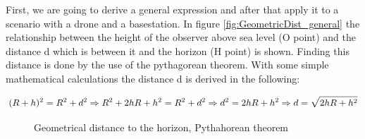 First, we are going to derive a general expression and after that apply it to a scenario with a drone and a basestation. In figure  \ref{fig:GeometricDist_general} the relationship between the height of the observer above sea level (O point) and the distance d which is between it and the horizon (H point) is shown. Finding this distance is done by the use of the pythagorean theorem. With some simple mathematical calculations the distance d is derived in the following:

\begin{equation}\label{eq:los_distToHorizon}
	(R+h)^2 = R^2+d^2\nonumber \\
	\Rightarrow R^2+2hR+h^2 = R^2+d^2 \Rightarrow d^2 = 2hR + h^2 \\
	\Rightarrow d = \sqrt{2hR + h^2}
\end{equation} 

\begin{figure}
    \hfill
	\hfill
    \hfill
    \caption{Geometrical distance to the horizon, Pythahorean theorem}
\end{figure}

